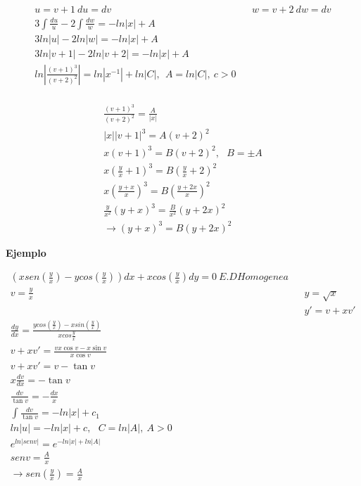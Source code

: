 \documentclass{article}
\begin{document}
\begin{eqnarray}
\nonumber u = v + 1 \ du =dv &			& w = v+2 \ dw=dv \\
\nonumber 3 \int \frac{du}{u} - 2 \int \frac{dw}{w} = -ln |x| + A \\
\nonumber 3 ln|u| - 2ln |w| = -ln|x| + A \\
\nonumber 3 ln |v+1| - 2 ln |v +2 | =  -ln|x| + A \\
\nonumber ln | \frac{(v+1)^3}{(v+2)^2} | = ln|x^{-1}| + ln |C|, \ \ A =ln |C|, \ c>0 \\
\end{eqnarray}

\begin{eqnarray}
\nonumber \frac{(v+1)^3}{(v+2)^2} = \frac{A}{|x|} \\
\nonumber |x| | v +1 |^3 = A (v+2)^2 \\ 
\nonumber x (v+1)^3 = B (v+2) ^2 , \ \ \ B = \pm A \\
\nonumber x \left( \frac{y}{x} +1 \right)^3 = B \left( \frac{y}{x} + 2 \right)^2 \\
\nonumber x \left( \frac{y+x}{x} \right)^3 = B \left(\frac{y+2x}{x} \right)^2 \\
\nonumber \frac{y}{x^2} \left( y+x \right)^3 = \frac{B}{x^2} \left( y + 2x \right)^2 \\
\nonumber \rightarrow \left( y + x \right)^3 = B \left( y + 2x \right)^2
\end{eqnarray}

\textbf{Ejemplo}

\begin{eqnarray}
\nonumber \left( xsen \left(\frac{y}{x} \right) - y cos \left(\frac{y}{x} \right) \right)dx + x cos \left( \frac{y}{x} \right) dy = 0 \  E.D Homogenea \\
\nonumber v = \frac{y}{x} &		& y = \sqrt{x} \\
\nonumber &	& y'= v + xv'\\
\nonumber \frac{dy}{dx} = \frac{y cos \left( \frac{y}{x} \right) - x sin \left(\frac{y}{x}\right)}{x cos \frac{y}{x}} \\
\nonumber v + xv' = \frac{vx \cos v - x \sin v}{x \cos v} \\
\nonumber v + xv' = v - \tan v \\
\nonumber x \frac{dv}{dx} =  - \tan v \\
\nonumber \frac{dv}{\tan v} = - \frac{dx}{x} \\
\nonumber \int \frac{dv}{\tan v} = -ln |x| + c_1 \\
\nonumber ln |u| = -ln |x| + c , \ \ \ C = ln|A|, \  A>0 \\
\nonumber e^{ln| sen v | } = e^{-ln|x| + ln |A|} \\
\nonumber sen v = \frac{A}{x} \\
\nonumber \rightarrow sen \left( \frac{y}{x} \right) = \frac{A}{x} \\
\end{eqnarray}
\end{document}
